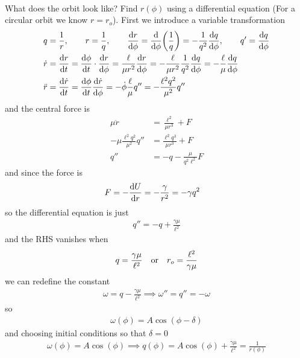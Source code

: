 \documentclass[../main.tex]{subfiles}
\begin{document}
\paragraph*{} What does the orbit look like? Find $r(\phi)$ using a differential equation 
(For a circular orbit we know $r = r_o$). First we introduce a variable transformation
\begin{align*}
    q &= \frac{1}{r}, \qquad r = \frac{1}{q}, 
        \qquad \dv{r}{\phi} = \dv{\phi}(\frac{1}{q}) = - \frac{1}{q^2} \dv{q}{\phi},
        \qquad q' = \dv{q}{\phi} \\
    \dot r &= \dv{r}{t} = \dv{\phi}{t} \cdot \dv{r}{\phi} = \frac{\ell}{\mu r^2} \dv{r}{\phi}
        = - \frac{\ell}{\mu r^2} \frac{1}{q^2} \dv{q}{\phi} = - \frac{\ell}{\mu} \dv{q}{\phi} \\
    \ddot r &= \dv{\dot r}{t} = \dv{\phi}{t} \dv{\dot r}{\phi} = - \dot\phi \frac{\ell}{\mu} q''
        = -\frac{\ell^2q^2}{\mu^2} q''
\end{align*}
and the central force is
\begin{align*}
    \mu \ddot r &= \frac{\ell^2}{\mu r^3} + F \\
    -\mu \frac{\ell^2 q^2}{\mu^2} q'' &= \frac{\ell^2 q^3}{\mu r^3} + F \\
    q'' &= -q - \frac{\mu}{q^2\ell^2} F
\end{align*}
and since the force is
\begin{align*}
    F &= -\dv{U}{r} = -\frac{\gamma}{r^2} = - \gamma q^2
\end{align*}
so the differential equation is just
\begin{align*}
    q'' = -q + \frac{\gamma \mu}{\ell^2} 
\end{align*}
and the RHS vanishes when
\begin{align*}
    q = \frac{\gamma \mu}{\ell^2} \qor r_o = \frac{\ell^2}{\gamma \mu}
\end{align*}
we can redefine the constant
\begin{align*}
    \omega = q - \frac{\gamma \mu}{\ell^2} \implies \omega'' = q'' = -\omega
\end{align*}
so 
\begin{align*}
    \omega(\phi) = A \cos(\phi - \delta) 
\end{align*}
and choosing initial conditions so that $\delta = 0$
\begin{align*}
    \omega(\phi) = A \cos(\phi) \implies q(\phi) = A \cos(\phi) + \frac{\gamma \mu}{\ell^2} = \frac{1}{r(\phi)}
\end{align*}
\end{document}
